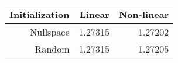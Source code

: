 \begin{tabular}{rrr}
  \hline
  \textbf{Initialization} & \textbf{Linear} & \textbf{Non-linear} \\\hline
  Nullspace & 1.27315 & 1.27202 \\
  Random & 1.27315 & 1.27205 \\\hline
\end{tabular}
